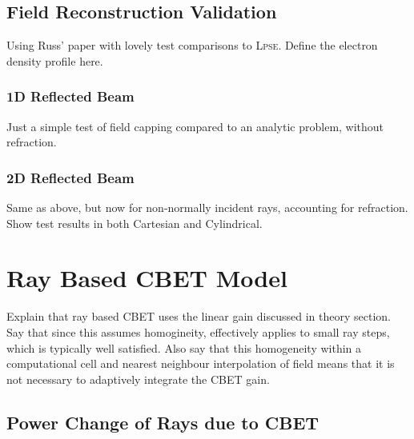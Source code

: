 \subsection{Field Reconstruction Validation}
Using Russ' paper with lovely test comparisons to \textsc{Lpse}.
Define the electron density profile here.

\subsubsection{1D Reflected Beam}
Just a simple test of field capping compared to an analytic problem, without refraction.

\subsubsection{2D Reflected Beam}
Same as above, but now for non-normally incident rays, accounting for refraction.
Show test results in both Cartesian and Cylindrical.


\section{Ray Based CBET Model}

Explain that ray based CBET uses the linear gain discussed in theory section.
Say that since this assumes homogineity, effectively applies to small ray steps, which is typically well satisfied.
Also say that this homogeneity within a computational cell and nearest neighbour interpolation of field means that it is not necessary to adaptively integrate the CBET gain.

\subsection{Power Change of Rays due to CBET}

